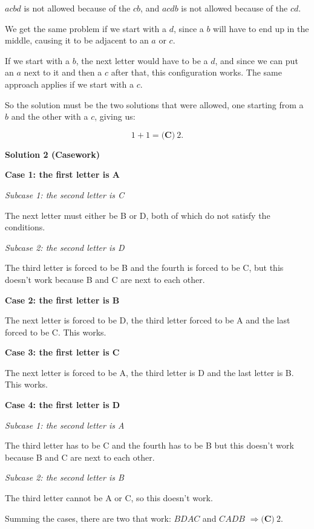 \begin{enumerate}
 $acbd$ is not allowed because of the $cb$, and $acdb$ is not allowed because of the $cd$. 

 We get the same problem if we start with a $d$, since a $b$ will have to end up in the middle, causing it to be adjacent to an $a$ or $c$.

 If we start with a $b$, the next letter would have to be a $d$, and since we can put an $a$ next to it and then a $c$ after that, this configuration works.  The same approach applies if we start with a $c$.

 So the solution must be the two solutions that were allowed, one starting from a $b$ and the other with a $c$, giving us:

 
 \[1 + 1 = \boxed{\textbf{(C)}\ 2}.\]




\textbf{Solution 2 (Casework)}

\textbf{Case 1: the first letter is A}

 \textit{Subcase 1: the second letter is C}

 The next letter must either be B or D, both of which do not satisfy the conditions.

 \textit{Subcase 2: the second letter is D}

 The third letter is forced to be B and the fourth is forced to be C, but this doesn't work because B and C are next to each other.

 \textbf{Case 2: the first letter is B}

 The next letter is forced to be D, the third letter forced to be A and the last forced to be C. This works.

 \textbf{Case 3: the first letter is C}

 The next letter is forced to be A, the third letter is D and the last letter is B. This works.

 \textbf{Case 4: the first letter is D}

 \textit{Subcase 1: the second letter is A}

 The third letter has to be C and the fourth has to be B but this doesn't work because B and C are next to each other.

 \textit{Subcase 2: the second letter is B}

 The third letter cannot be A or C, so this doesn't work.

 Summing the cases, there are two that work: $BDAC$ and $CADB$ $\Longrightarrow \boxed{\textbf{(C)}\ 2}$.

 



\end{enumerate}
